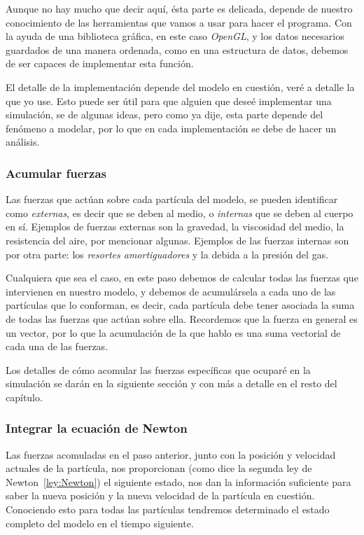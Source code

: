 Aunque no hay mucho que decir aquí, ésta parte es delicada, depende de nuestro conocimiento de las herramientas que vamos a usar para hacer el programa.
Con la ayuda de una biblioteca gráfica, en este caso \emph{\textenglish{OpenGL}}, y los datos necesarios guardados de una manera ordenada, como en una estructura de datos, debemos de ser capaces de implementar esta función.

El detalle de la implementación depende del modelo en cuestión, veré a detalle la que yo use.
Esto puede ser útil para que alguien que deseé implementar una simulación, se de algunas ideas, pero como ya dije, esta parte depende del fenómeno a modelar, por lo que en cada implementación se debe de hacer un análisis.

\subsubsection{Acumular fuerzas}
Las fuerzas que actúan sobre cada partícula del modelo, se pueden identificar como \emph{externas}, es decir que se deben al medio, o \emph{internas} que se deben al cuerpo en sí.
Ejemplos de fuerzas externas son la gravedad, la viscosidad del medio, la resistencia del aire, por mencionar algunas.
Ejemplos de las fuerzas internas son por otra parte: los \emph{resortes amortiguadores} y la debida a la presión del gas.

Cualquiera que sea el caso, en este paso debemos de calcular todas las fuerzas que intervienen en nuestro modelo, y debemos de acumulársela a cada uno de las partículas que lo conforman, es decir, cada partícula debe tener asociada la suma de todas las fuerzas que actúan sobre ella.
Recordemos que la fuerza en general es un vector, por lo que la acumulación de la que hablo es una suma vectorial de cada una de las fuerzas.

Los detalles de cómo acomular las fuerzas específicas que ocuparé en la simulación se darán en la siguiente sección y con más a detalle en el resto del capítulo.

\subsubsection{Integrar la ecuación de Newton}
Las fuerzas acomuladas en el paso anterior, junto con la posición y velocidad actuales de la partícula, nos proporcionan (como dice la segunda ley de Newton~\eqref{ley:Newton}) el siguiente estado, nos dan la información suficiente para saber la nueva posición y la nueva velocidad de la partícula en cuestión. 
Conociendo esto para todas las partículas tendremos determinado el estado completo del modelo en el tiempo siguiente.

